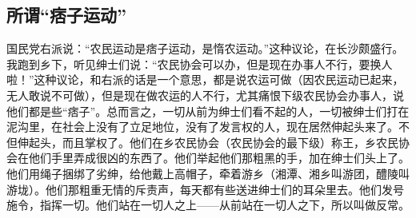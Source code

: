 \documentclass[cn,11pt,chinese]{elegantbook}
\def\myformat#1{\hfil\hfil #1}
\begin{document}
\subsection*{\myformat{所谓“痞子运动”}}
国民党右派说：“农民运动是痞子运动，是惰农运动。”这种议论，在长沙颇盛行。我跑到乡下，听见绅士们说：“农民协会可以办，但是现在办事人不行，要换人啦！”这种议论，和右派的话是一个意思，都是说农运可做（因农民运动已起来，无人敢说不可做），但是现在做农运的人不行，尤其痛恨下级农民协会办事人，说他们都是些“痞子”。总而言之，一切从前为绅士们看不起的人，一切被绅士们打在泥沟里，在社会上没有了立足地位，没有了发言权的人，现在居然伸起头来了。不但伸起头，而且掌权了。他们在乡农民协会（农民协会的最下级）称王，乡农民协会在他们手里弄成很凶的东西了。他们举起他们那粗黑的手，加在绅士们头上了。他们用绳子捆绑了劣绅，给他戴上高帽子，牵着游乡（湘潭、湘乡叫游团，醴陵叫游垅）。他们那粗重无情的斥责声，每天都有些送进绅士们的耳朵里去。他们发号施令，指挥一切。他们站在一切人之上——从前站在一切人之下，所以叫做反常。\\
\end{document}
